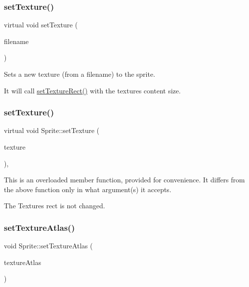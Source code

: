 \subsubsection{\texorpdfstring{set\+Texture()}{setTexture()}\hspace{0.1cm}{\footnotesize\ttfamily [3/4]}}
{\footnotesize\ttfamily virtual void set\+Texture (\begin{DoxyParamCaption}\item[{const std\+::string \&}]{filename }\end{DoxyParamCaption})\hspace{0.3cm}{\ttfamily [virtual]}}

Sets a new texture (from a filename) to the sprite.

It will call {\ttfamily \hyperlink{classSprite_a3d342558db357e2bec2eb3368b41bd1f}{set\+Texture\+Rect()}} with the texture\textquotesingle{}s content size. \mbox{\label{classSprite_a6d0db21ed8499478056aa79fe9c1a344}} 
\subsubsection{\texorpdfstring{set\+Texture()}{setTexture()}\hspace{0.1cm}{\footnotesize\ttfamily [4/4]}}
{\footnotesize\ttfamily virtual void Sprite\+::set\+Texture (\begin{DoxyParamCaption}\item[{\hyperlink{classTexture2D}{Texture2D} $\ast$}]{texture }\end{DoxyParamCaption})\hspace{0.3cm}{\ttfamily [override]}, {\ttfamily [virtual]}}

This is an overloaded member function, provided for convenience. It differs from the above function only in what argument(s) it accepts.

The Texture\textquotesingle{}s rect is not changed. \mbox{\label{classSprite_a66f74cd6fa807964c5a9d06d6c927e38}} 
\subsubsection{\texorpdfstring{set\+Texture\+Atlas()}{setTextureAtlas()}\hspace{0.1cm}{\footnotesize\ttfamily [1/2]}}
{\footnotesize\ttfamily void Sprite\+::set\+Texture\+Atlas (\begin{DoxyParamCaption}\item[{\hyperlink{classTextureAtlas}{Texture\+Atlas} $\ast$}]{texture\+Atlas }\end{DoxyParamCaption})\hspace{0.3cm}{\ttfamily [inline]}}


